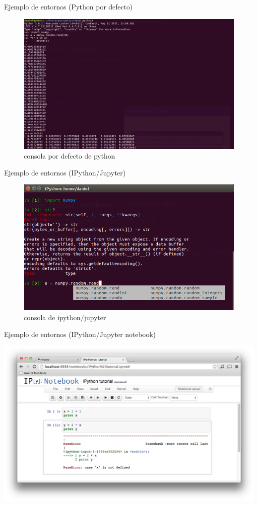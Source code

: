 \documentclass[bigger,unknownkeysallowed]{beamer}
\begin{document}
\begin{frame}[label={sec:org167c2dd}]{Ejemplo de entornos (Python por defecto)}
\begin{figure}[htbp]
\centering
\includegraphics[width=.8\textwidth]{python.png}
\caption{consola por defecto de python}
\end{figure}
\end{frame}

\begin{frame}[label={sec:org451f506}]{Ejemplo de entornos (IPython/Jupyter)}
\begin{figure}[htbp]
\centering
\includegraphics[width=.8\textwidth]{ipython.png}
\caption{consola de ipython/jupyter}
\end{figure}
\end{frame}

\begin{frame}[label={sec:org211832c}]{Ejemplo de entornos (IPython/Jupyter notebook)}
\begin{center}
\includegraphics[width=.8\textwidth]{notebook1.png}
\end{center}
\end{frame}
\end{document}
